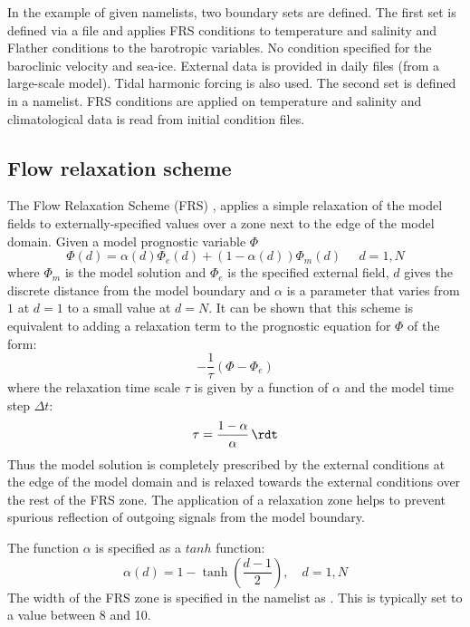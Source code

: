 \documentclass[../main/NEMO_manual]{subfiles}
\begin{document}
In the example of given namelists, two boundary sets are defined.
The first set is defined via a file and applies FRS conditions to temperature and salinity and
Flather conditions to the barotropic variables. No condition specified for the baroclinic velocity and sea-ice.
External data is provided in daily files (from a large-scale model).
Tidal harmonic forcing is also used.
The second set is defined in a namelist.
FRS conditions are applied on temperature and salinity and climatological data is read from initial condition files.

\subsection{Flow relaxation scheme}
\label{subsec:LBC_bdy_FRS_scheme}

The Flow Relaxation Scheme (FRS) \citep{davies_QJRMS76,engedahl_T95},
applies a simple relaxation of the model fields to externally-specified values over
a zone next to the edge of the model domain.
Given a model prognostic variable $\Phi$
\[
  \Phi(d) = \alpha(d)\Phi_{e}(d) + (1-\alpha(d))\Phi_{m}(d)\;\;\;\;\; d=1,N
\]
where $\Phi_{m}$ is the model solution and $\Phi_{e}$ is the specified external field,
$d$ gives the discrete distance from the model boundary and
$\alpha$ is a parameter that varies from $1$ at $d=1$ to a small value at $d=N$.
It can be shown that this scheme is equivalent to adding a relaxation term to
the prognostic equation for $\Phi$ of the form:
\[
  -\frac{1}{\tau}\left(\Phi - \Phi_{e}\right)
\]
where the relaxation time scale $\tau$ is given by a function of $\alpha$ and the model time step $\Delta t$:
\[
  \tau = \frac{1-\alpha}{\alpha}  \,\rdt
\]
Thus the model solution is completely prescribed by the external conditions at the edge of the model domain and
is relaxed towards the external conditions over the rest of the FRS zone.
The application of a relaxation zone helps to prevent spurious reflection of
outgoing signals from the model boundary.

The function $\alpha$ is specified as a $tanh$ function:
\[
  \alpha(d) = 1 - \tanh\left(\frac{d-1}{2}\right),       \quad d=1,N
\]
The width of the FRS zone is specified in the namelist as .
This is typically set to a value between 8 and 10.
\end{document}
